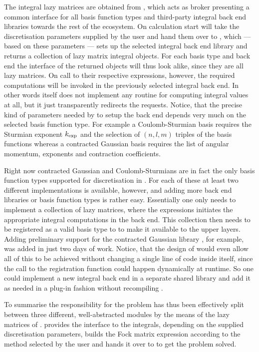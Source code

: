 The integral lazy matrices are obtained from \gint,
which acts as broker presenting a common interface for all
basis function types and third-party integral back end libraries
towards the rest of the \molsturm ecosystem.
On calculation start \molsturm will take the discretisation parameters
supplied by the user and hand them over to \gint,
which --- based on these parameters ---
sets up the selected integral back end library
and returns a collection of lazy matrix integral objects.
For each basis type and back end the interface of the returned objects
will thus look alike, since they are all lazy matrices.
On call to their respective \contraction expressions, however,
the required computations will be invoked in the previously selected
integral back end.
In other words \gint itself does not implement any routine
for computing integral values at all,
but it just transparently redirects the requests.
Notice, that the precise kind of parameters needed by \gint
to setup the back end depends very much
on the selected basis function type.
For example a Coulomb-Sturmian basis requires the Sturmian exponent $k_\text{exp}$
and the selection of $(n, l, m)$ triples of the basis functions
whereas a contracted Gaussian basis requires the list of angular momentum,
exponents and contraction coefficients.

Right now contracted Gaussian and Coulomb-Sturmians
are in fact the only basis function types supported for discretisation in \gint.
For each of these at least two different implementations is available, however,
and adding more back end libraries or basis function types is rather easy.
Essentially one only needs to implement a collection of lazy matrices,
where the \contraction expressions initiates the appropriate
integral computations in the back end.
This collection then needs to be registered as a valid basis type
to \gint to make it available to the upper layers.
Adding preliminary support for the contracted Gaussian library
\libcint, for example, was added in just two days of work.
Notice, that the design of \gint would even allow all of this to be achieved
without changing a single line of code inside \gint itself,
since the call to the registration function could happen dynamically at runtime.
So one could implement a new integral back end in a separate shared library
and add it as needed in a plug-in fashion without recompiling \molsturm.

To summarise the responsibility for the \HF problem
has thus been effectively split between three different,
well-abstracted modules by the means of the lazy matrices of \lazyten.
\gint provides the interface to the integrals,
depending on the supplied discretisation parameters,
\molsturm builds the Fock matrix expression
according to the method selected by the user
and hands it over to \gscf to get the \SCF problem solved.

